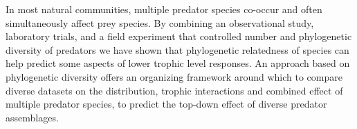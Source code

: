 In most natural communities, multiple predator species co-occur and
often simultaneously affect prey species. By combining an observational
study, laboratory trials, and a field experiment that controlled number
and phylogenetic diversity of predators we have shown that phylogenetic
relatedness of species can help predict some aspects of lower trophic
level responses. An approach based on phylogenetic diversity offers an
organizing framework around which to compare diverse datasets on the
distribution, trophic interactions and combined effect of multiple
predator species, to predict the top-down effect of diverse predator
assemblages.
